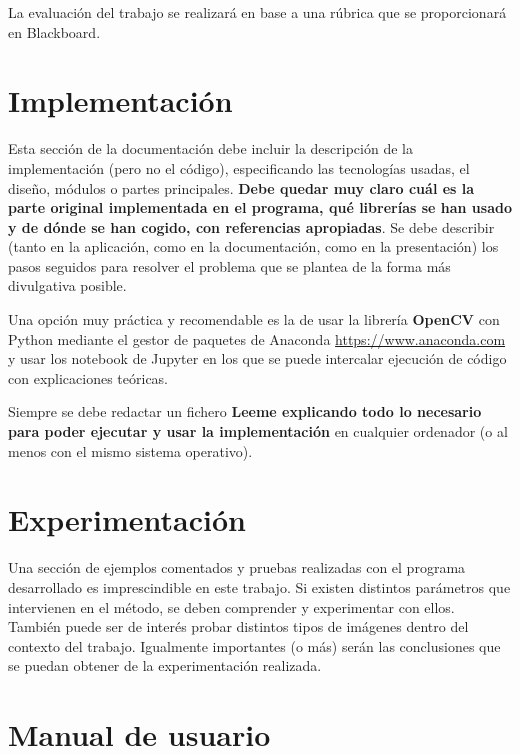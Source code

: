 \documentclass[a4paper]{article}
\begin{document}
La evaluación del trabajo se realizará en base a una rúbrica que se proporcionará en Blackboard.





\section{Implementación}

Esta sección de la documentación  debe incluir la descripción de la implementación (pero no el código), especificando las tecnologías usadas, el diseño, módulos o partes principales. \textbf{Debe quedar muy claro cuál es la parte original implementada en el programa, qué librerías se han usado y de dónde se han cogido, con referencias apropiadas}. Se debe describir (tanto en la aplicación, como en la documentación, como en la presentación) los pasos seguidos para resolver el problema que se plantea de la forma más divulgativa posible. 

Una opción muy práctica y recomendable es la de usar la librería \textbf{OpenCV} con Python mediante el gestor de paquetes de Anaconda \url{https://www.anaconda.com} y usar los notebook de Jupyter en los que se puede intercalar ejecución de código con explicaciones teóricas. %

Siempre se debe redactar un fichero {\bf Leeme explicando todo lo necesario para poder ejecutar y usar la implementación} en cualquier ordenador (o al menos con el mismo sistema operativo).



\section{Experimentación}

Una sección de ejemplos comentados y pruebas realizadas con el programa desarrollado es imprescindible en este trabajo. Si existen distintos parámetros que intervienen en el método, se deben comprender y experimentar con ellos. También puede ser de interés probar distintos tipos de imágenes dentro del contexto del trabajo. Igualmente importantes (o más) serán las conclusiones que se puedan obtener de la experimentación realizada. 


\section{Manual de usuario}
\end{document}
